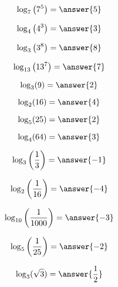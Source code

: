 \documentclass{ximera}
\author{Lee Wayand}
\begin{document}
\begin{example}













\[
\log_7\left( 7^5 \right) = \answer{5}
\]





\[
\log_4\left( 4^3 \right) = \answer{3}
\]







\[
\log_3\left( 3^8 \right) = \answer{8}
\]





\[
\log_{13}\left( 13^7 \right) = \answer{7}
\]









\[
\log_3(9) = \answer{2}
\]





\[
\log_2(16) = \answer{4}
\]






\[
\log_5(25) = \answer{2}
\]





\[
\log_4(64) = \answer{3}
\]
















\[
\log_3\left( \frac{1}{3} \right) = \answer{-1}
\]






\[
\log_2\left( \frac{1}{16} \right) = \answer{-4}
\]






\[
\log_{10}\left( \frac{1}{1000} \right) = \answer{-3}
\]





\[
\log_5\left( \frac{1}{25} \right) = \answer{-2}
\]









\[
\log_3(\sqrt{3}) = \answer{\frac{1}{2}}
\]












\end{example}
\end{document}
